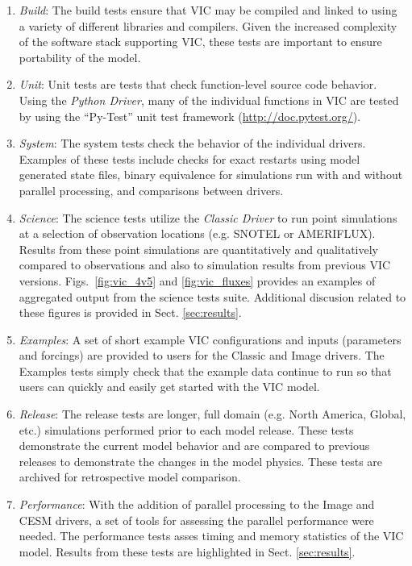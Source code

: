 \documentclass[gmd, manuscript]{copernicus}
\begin{document}
    \begin{enumerate}
      \item \textit{Build}: The build tests ensure that VIC may be compiled and linked to using a variety of different libraries and compilers. Given the increased complexity of the software stack supporting VIC, these tests are important to ensure portability of the model.

      \item \textit{Unit}: Unit tests are tests that check function-level source code behavior. Using the \textit{Python Driver}, many of the individual functions in VIC are tested by using the ``Py-Test'' unit test framework (\url{http://doc.pytest.org/}).

      \item \textit{System}: The system tests check the behavior of the individual drivers. Examples of these tests include checks for exact restarts using model generated state files, binary equivalence for simulations run with and without parallel processing, and comparisons between drivers.

      \item \textit{Science}: The science tests utilize the \textit{Classic Driver} to run point simulations at a selection of observation locations (e.g. SNOTEL or AMERIFLUX). Results from these point simulations are quantitatively and qualitatively compared to observations and also to simulation results from previous VIC versions. Figs.~\ref{fig:vic_4v5} and \ref{fig:vic_fluxes} provides an examples of aggregated output from the science tests suite. Additional discusion related to these figures is provided in Sect. \ref{sec:results}.

      \item \textit{Examples}: A set of short example VIC configurations and inputs (parameters and forcings) are provided to users for the Classic and Image drivers. The Examples tests simply check that the example data continue to run so that users can quickly and easily get started with the VIC model.

      \item \textit{Release}: The release tests are longer, full domain (e.g. North America, Global, etc.) simulations performed prior to each model release. These tests demonstrate the current model behavior and are compared to previous releases to demonstrate the changes in the model physics. These tests are archived for retrospective model comparison.

      \item \textit{Performance}: With the addition of parallel processing to the Image and CESM drivers, a set of tools for assessing the parallel performance were needed. The performance tests asses timing and memory statistics of the VIC model. Results from these tests are highlighted in Sect. \ref{sec:results}.
    \end{enumerate}
\end{document}
